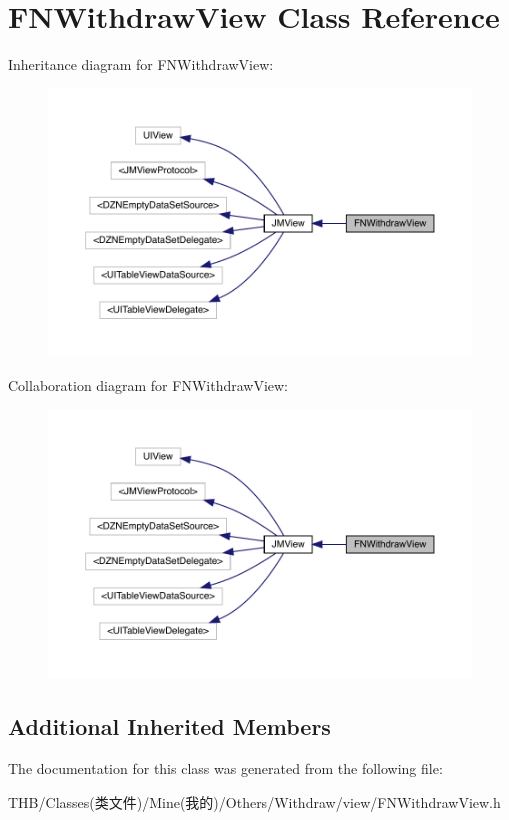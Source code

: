 \hypertarget{interface_f_n_withdraw_view}{}\section{F\+N\+Withdraw\+View Class Reference}
\label{interface_f_n_withdraw_view}


Inheritance diagram for F\+N\+Withdraw\+View\+:\nopagebreak
\begin{figure}[H]
\begin{center}
\leavevmode
\includegraphics[width=350pt]{interface_f_n_withdraw_view__inherit__graph}
\end{center}
\end{figure}


Collaboration diagram for F\+N\+Withdraw\+View\+:\nopagebreak
\begin{figure}[H]
\begin{center}
\leavevmode
\includegraphics[width=350pt]{interface_f_n_withdraw_view__coll__graph}
\end{center}
\end{figure}
\subsection*{Additional Inherited Members}


The documentation for this class was generated from the following file\+:\begin{DoxyCompactItemize}
\item 
T\+H\+B/\+Classes(类文件)/\+Mine(我的)/\+Others/\+Withdraw/view/F\+N\+Withdraw\+View.\+h\end{DoxyCompactItemize}
